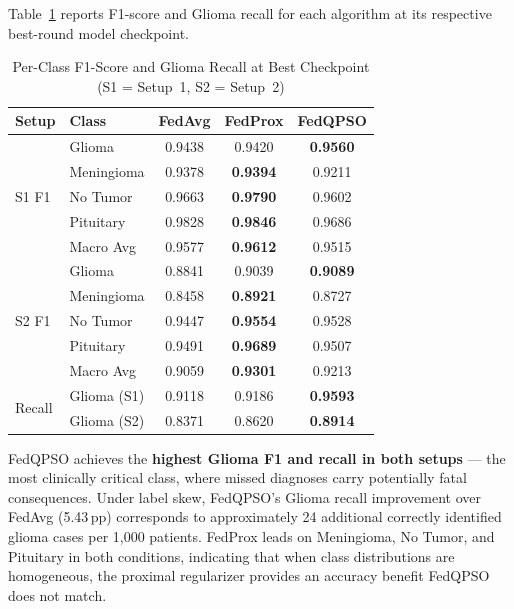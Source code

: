 \documentclass[conference]{IEEEtran}
\begin{document}
Table~\ref{tab:perclass} reports F1-score and Glioma recall for each
algorithm at its respective best-round model checkpoint.

\begin{table}[htbp]
\caption{Per-Class F1-Score and Glioma Recall at Best Checkpoint
(S1 = Setup~1, S2 = Setup~2)}
\label{tab:perclass}
\begin{center}
\renewcommand{\arraystretch}{1.15}
\begin{tabular}{llccc}
\hline
\textbf{Setup} & \textbf{Class} & \textbf{FedAvg} & \textbf{FedProx} &
\textbf{FedQPSO}\\
\hline
\multirow{5}{*}{S1 F1}
 & Glioma     & 0.9438 & 0.9420 & \textbf{0.9560}\\
 & Meningioma & 0.9378 & \textbf{0.9394} & 0.9211\\
 & No Tumor   & 0.9663 & \textbf{0.9790} & 0.9602\\
 & Pituitary  & 0.9828 & \textbf{0.9846} & 0.9686\\
 & Macro Avg  & 0.9577 & \textbf{0.9612} & 0.9515\\
\hline
\multirow{5}{*}{S2 F1}
 & Glioma     & 0.8841 & 0.9039 & \textbf{0.9089}\\
 & Meningioma & 0.8458 & \textbf{0.8921} & 0.8727\\
 & No Tumor   & 0.9447 & \textbf{0.9554} & 0.9528\\
 & Pituitary  & 0.9491 & \textbf{0.9689} & 0.9507\\
 & Macro Avg  & 0.9059 & \textbf{0.9301} & 0.9213\\
\hline
\multirow{2}{*}{Recall}
 & Glioma (S1) & 0.9118 & 0.9186 & \textbf{0.9593}\\
 & Glioma (S2) & 0.8371 & 0.8620 & \textbf{0.8914}\\
\hline
\end{tabular}
\end{center}
\end{table}

FedQPSO achieves the \textbf{highest Glioma F1 and recall in both setups}
--- the most clinically critical class, where missed diagnoses carry
potentially fatal consequences. Under label skew, FedQPSO's Glioma recall
improvement over FedAvg (5.43\,pp) corresponds to approximately 24
additional correctly identified glioma cases per 1,000 patients.
FedProx leads on Meningioma, No Tumor, and Pituitary in both conditions,
indicating that when class distributions are homogeneous, the proximal
regularizer provides an accuracy benefit FedQPSO does not match.
\end{document}

